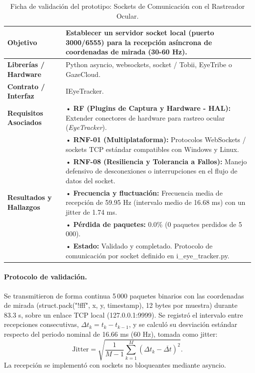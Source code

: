 \begin{table}[H]
    \centering
    \caption{Ficha de validación del prototipo: Sockets de Comunicación con el Rastreador Ocular.}
    \label{tab:ficha_f10}
    \begin{tabular}{|L{3.2cm}|L{11.0cm}|}
        \hline
        \textbf{Objetivo} & Establecer un servidor socket local (puerto 3000/6555) para la recepción asíncrona de coordenadas de mirada (30-60 Hz). \\ \hline
        \textbf{Librerías / Hardware} & Python asyncio, websockets, socket / Tobii, EyeTribe o GazeCloud. \\ \hline
        \textbf{Contrato / Interfaz} & IEyeTracker. \\ \hline
        \textbf{Requisitos Asociados} &
        • \textbf{RF (Plugins de Captura y Hardware - HAL):} Extender conectores de hardware para rastreo ocular (\textit{EyeTracker}). \vspace{0.1cm} \\
        & • \textbf{RNF-01 (Multiplataforma):} Protocolos WebSockets / sockets TCP estándar compatibles con Windows y Linux. \vspace{0.1cm} \\
        & • \textbf{RNF-08 (Resiliencia y Tolerancia a Fallos):} Manejo defensivo de desconexiones o interrupciones en el flujo de datos del socket. \\ \hline
        \textbf{Resultados y Hallazgos} &
        • \textbf{Frecuencia y fluctuación:} Frecuencia media de recepción de 59.95 Hz (intervalo medio de 16.68 ms) con un jitter de 1.74 ms. \vspace{0.1cm} \\
        & • \textbf{Pérdida de paquetes:} 0.0\% (0 paquetes perdidos de 5\,000). \vspace{0.1cm} \\
        & • \textbf{Estado:} Validado y completado. Protocolo de comunicación por socket definido en i\_eye\_tracker.py. \\ \hline
    \end{tabular}
\end{table}
 
\paragraph{Protocolo de validación.} Se transmitieron de forma continua 5\,000 paquetes binarios con las coordenadas de mirada (struct.pack("!fff", x, y, timestamp), 12 bytes por muestra) durante 83.3 s, sobre un enlace TCP local (127.0.0.1:9999). Se registró el intervalo entre recepciones consecutivas, $\Delta t_k = t_k - t_{k-1}$, y se calculó su desviación estándar respecto del periodo nominal de 16.66 ms (60 Hz), tomada como jitter:
\[ \mathrm{Jitter} = \sqrt{\frac{1}{M-1} \sum_{k=1}^{M} \left(\Delta t_k - \overline{\Delta t}\right)^2}. \]
La recepción se implementó con sockets no bloqueantes mediante asyncio.
 
